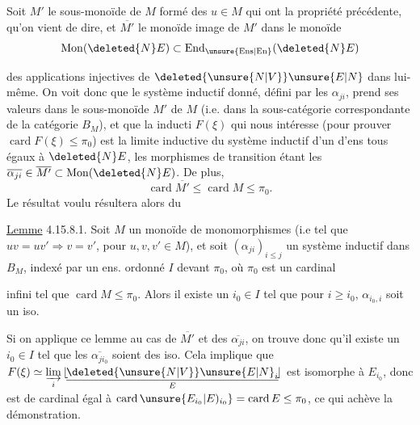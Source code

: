 Soit $M'$ le sous-monoïde de $M$ formé des $u\in M$ qui ont la propriété  précédente,   qu'on vient de dire, et $\overline{M'}$ le monoïde  image de $M'$ dans le monoïde
\[
\operatorname{Mon}(\deleted{N}E)\subset\operatorname{End}_{\unsure{\mathrm{Ens}|\mathrm{En}}}(\deleted{N}E)
\]

des applications injectives de $\deleted{\unsure{N|V}}\unsure{E|N}$ dans lui-même. On voit donc que le système inductif donné, défini par les $\alpha_{ji}$, prend ses valeurs dans le sous-monoïde $M'$ de $M$ (i.e. dans la sous-catégorie
correspondante de  la catégorie $B_M$), et que la   inducti $F(\xi)$ qui nous intéresse (pour prouver $\operatorname{card} F(\xi)\leq\pi_0$)
est   la limite inductive du système inductif  d'un   d'ens tous égaux à $\deleted{N}E$, les morphismes de transition étant les $\overline{\alpha_{ji}}\in\overline{M'}\subset\operatorname{Mon}(\deleted{N}E)$. De plus,
  
\[
\operatorname{card}\overline{M'}\leq\operatorname{card}M\leq\pi_0.
\]
 Le résultat  voulu résultera alors du

\uline{Lemme} 4.15.8.1. Soit $M$ un monoïde de monomorphismes (i.e tel que $uv=uv'\Longrightarrow v=v'$, pour $u,v,v'\in M$), et soit
$(\alpha_{ji})_{i\leq j}$ un système inductif dans $B_M$, indexé par un ens. ordonné $I$  devant $\pi_0$, où $\pi_0$ est un cardinal

infini tel que $\operatorname{card} M\leq\pi_0$. Alors il existe un $i_0\in I$ tel que pour  $i\geq i_0$, $\alpha_{i_0,i}$ soit un iso.

Si on applique ce lemme au cas de $\overline{M'}$ et des $\overline{\alpha_{ji}}$, on trouve donc qu'il existe un $i_0\in I$ tel que les $\overline{\alpha_{ji_0}}$ soient des iso. Cela implique que
$F(\xi)\simeq\underset{i}{\varinjlim}\,\underset{E}{\lfloor\!\underline{\deleted{\unsure{N|V}}\unsure{E|N}_i}\!\rfloor}$ est isomorphe à $E_{i_0}$, donc est de cardinal égal à $\operatorname{card} \unsure{E_{i_0}|E)_{i_0}}=\operatorname{card} E\leq\pi_0$, ce qui achève la démonstration.

